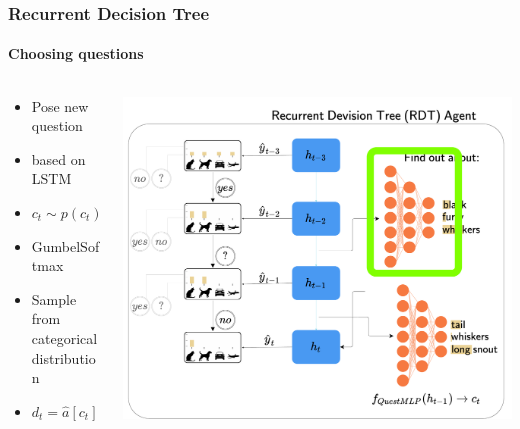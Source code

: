 \documentclass[9pt]{beamer}
\begin{document}
\begin{frame}
\frametitle{Recurrent Decision Tree}
\framesubtitle{Choosing questions}
\begin{columns}[T]
\begin{column}{.5\textwidth}
\begin{itemize}
	\item Pose new question
	\item based on LSTM
	\item $c_t \sim p(c_t)$
	\item GumbelSoftmax
	\item Sample from categorical distribution
	\item $d_t = \hat{a}\left[c_t\right]$
\end{itemize}
\end{column}
\begin{column}{.5\textwidth}
\includegraphics[width=\textwidth]{images/urdtc_parts_questMLP.pdf}
\end{column}
\end{columns}
\end{frame}
\end{document}
